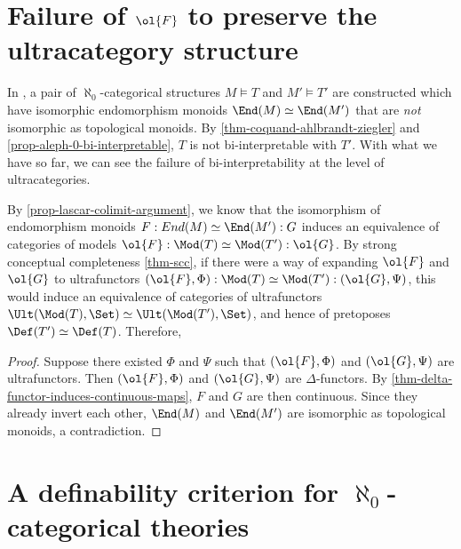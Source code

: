 \section{Failure of $\ol{F}$ to preserve the ultracategory structure}

In \cite{BEKP}, a pair of $\aleph_0$-categorical structures $M \models T$ and $M' \models T'$ are constructed which have isomorphic endomorphism monoids $\End(M) \simeq \End(M')$ that are \emph{not} isomorphic as topological monoids. By \ref{thm-coquand-ahlbrandt-ziegler} and \ref{prop-aleph-0-bi-interpretable}, $T$ is not bi-interpretable with $T'$. With what we have so far, we can see the failure of bi-interpretability at the level of ultracategories.

By \ref{prop-lascar-colimit-argument}, we know that the isomorphism of endomorphism monoids $F : \\End(M) \simeq \End(M') : G $ induces an equivalence of categories of models $\ol{F} : \Mod(T) \simeq \Mod(T') : \ol{G}$. By strong conceptual completeness \ref{thm-scc}, if there were a way of expanding $\ol{F}$ and $\ol{G}$ to ultrafunctors $(\ol{F}, \Phi) : \Mod(T) \simeq \Mod(T') :(\ol{G}, \Psi)$, this would induce an equivalence of categories of ultrafunctors $\Ult(\Mod(T), \Set) \simeq \Ult(\Mod(T'), \Set)$, and hence of pretoposes $\Def(T') \simeq \Def(T)$. Therefore,


\begin{proof} Suppose there existed $\Phi$ and $\Psi$ such that $(\ol{F}, \Phi)$ and $(\ol{G}, \Psi)$ are ultrafunctors. Then $(\ol{F}, \Phi)$ and $(\ol{G}, \Psi)$ are $\Delta$-functors. By \ref{thm-delta-functor-induces-continuous-maps}, $F$ and $G$ are then continuous. Since they already invert each other, $\End(M)$ and $\End(M')$ are isomorphic as topological monoids, a contradiction.
\end{proof}
  
\section{A definability criterion for $\aleph_0$-categorical theories}

